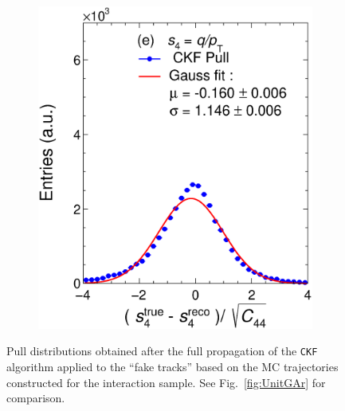 \begin{figure}[t]
\begin{subfigure}{0.32\textwidth}
         \includegraphics[width=\textwidth]{figures/ch5-KF_NDGAr/FullSample/Int/Units/Unit4.eps}
         \caption{}
         \label{fig:resp4KFGAr_Int}
     \end{subfigure}
        \caption[Pull distributions for the \texttt{CKF} algorithm applied to the \enquote{fake tracks} constructed for the interaction sample.]{Pull distributions obtained after the full propagation of the \texttt{CKF} algorithm applied to the \enquote{fake tracks} based on the MC trajectories constructed for the interaction sample. See Fig.~\ref{fig:UnitGAr} for comparison.}
        \label{fig:UnitGArKF_Int}
\end{figure}

